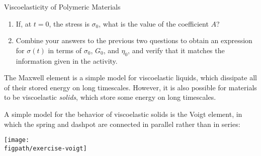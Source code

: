 \begin{activity}{Viscoelasticity of Polymeric Materials}
\begin{exercises}
\begin{enumerate}
					\begin{solution}\end{solution} 
					
				\item If, at $t=0$, the stress is $\sigma_0$, what is the value of the coefficient $A$?
				
					\begin{solution}\end{solution}
				
				\item Combine your answers to the previous two questions to obtain an expression for $\sigma(t)$ in terms of $\sigma_0$, $G_0$, and $\eta_0$, and verify that it matches the information given in the activity.
				
					\begin{solution}\end{solution}
			\end{enumerate}
		
		\exercise \label{\labelbase:exc:voigt} The Maxwell element is a simple model for viscoelastic liquids, which dissipate all of their stored energy on long timescales.  However, it is also possible for materials to be viscoelastic \emph{solids}, which store some energy on long timescales.
		
			A simple model for the behavior of viscoelastic solids is the Voigt element, in which the spring and dashpot are connected in parallel rather than in series:
		
			\vspace{3pt}
			\centerline{\texttt{[image: \\figpath/exercise-voigt]}}
			

\end{exercises}
\end{activity}
